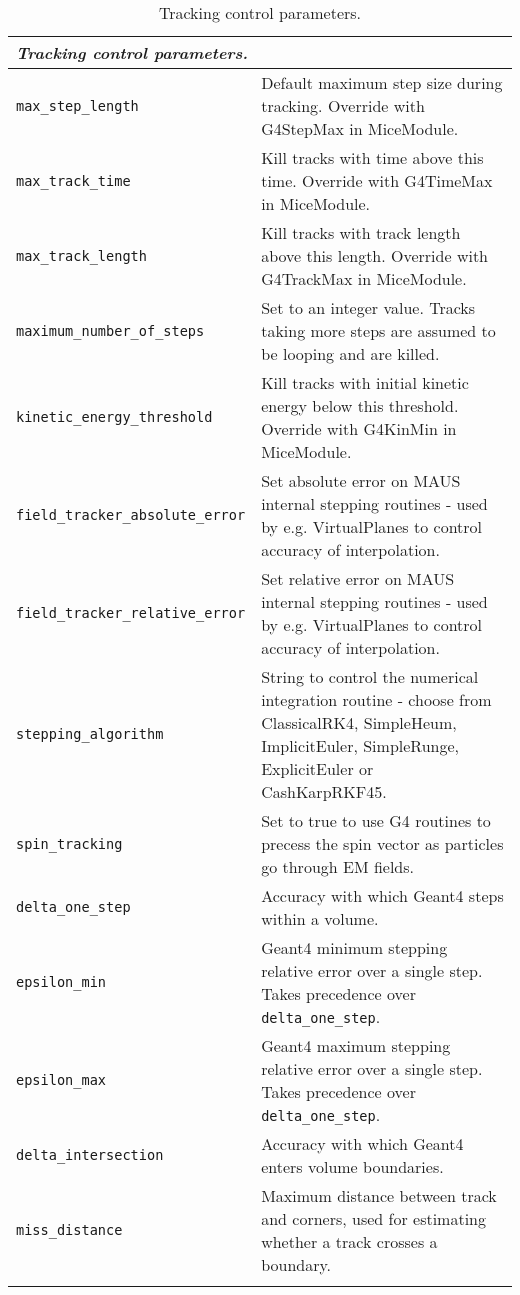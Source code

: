 \begin{table*}
\begin{center}
\caption{Tracking control parameters.}
\begin{tabularx}{\textwidth}{lX}
\hline
\multicolumn{2}{l}{\emph{Tracking control parameters.}} \\
\hline
\verb|max_step_length| & Default maximum step size during tracking. Override with G4StepMax in MiceModule. \\
\verb|max_track_time| & Kill tracks with time above this time. Override with G4TimeMax in MiceModule. \\
\verb|max_track_length| & Kill tracks with track length above this length. Override with G4TrackMax in MiceModule. \\
\verb|maximum_number_of_steps| & Set to an integer value. Tracks taking more steps are assumed to be looping and are killed.\\
\verb|kinetic_energy_threshold| & Kill tracks with initial kinetic energy below this threshold. Override with G4KinMin in MiceModule. \\
\verb|field_tracker_absolute_error| & Set absolute error on MAUS internal stepping routines - used by e.g. VirtualPlanes to control accuracy of interpolation. \\
\verb|field_tracker_relative_error| & Set relative error on MAUS internal stepping routines - used by e.g. VirtualPlanes to control accuracy of interpolation. \\
\verb|stepping_algorithm| & String to control the numerical integration routine - choose from ClassicalRK4, SimpleHeum, ImplicitEuler, SimpleRunge, ExplicitEuler or CashKarpRKF45. \\
\verb|spin_tracking| & Set to true to use G4 routines to precess the spin vector as particles go through EM fields. \\
\verb|delta_one_step| & Accuracy with which Geant4 steps within a volume. \\
\verb|epsilon_min| & Geant4 minimum stepping relative error over a single step. Takes precedence over \verb|delta_one_step|. \\
\verb|epsilon_max| & Geant4 maximum stepping relative error over a single step. Takes precedence over \verb|delta_one_step|. \\
\verb|delta_intersection| & Accuracy with which Geant4 enters volume boundaries.\\
\verb|miss_distance| & Maximum distance between track and corners, used for estimating whether a track crosses a boundary. \\
\begin{makeimage} %
\end{makeimage}
\end{tabularx}
\end{center}
\end{table*}

